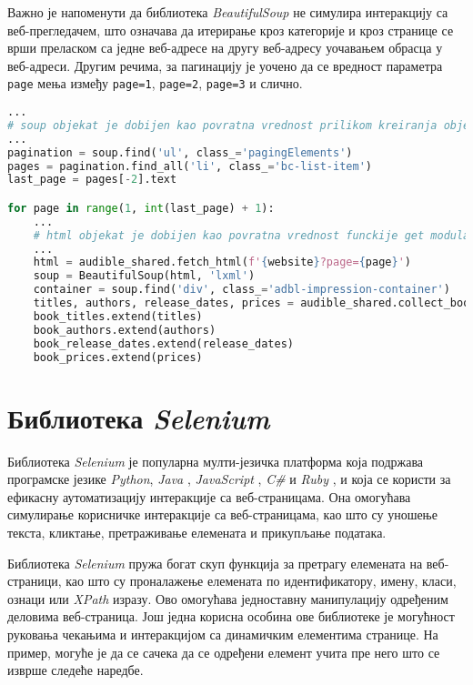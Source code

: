 \documentclass[12pt,oneside]{memoir}
\begin{document}
Важно је напоменути да библиотека \textit{BeautifulSoup} не симулира интеракцију са веб-прегледачем, што означава да итерирање кроз категорије и кроз странице се врши преласком са једне веб-адресе на другу веб-адресу уочавањем обрасца у веб-адреси. Другим речима, за пагинацију је уочено да се вредност параметра \texttt{page} мења између 
\texttt{page=1}, \texttt{page=2}, \texttt{page=3} и слично.
\begin{lstlisting}[language=Python, caption={Прикупљање података са више веб-страница}, label={lst:beautiful-soap-scrape-mutliple}]
...
# soup objekat je dobijen kao povratna vrednost prilikom kreiranja objekta tipa BeautifulSoup
...
pagination = soup.find('ul', class_='pagingElements')
pages = pagination.find_all('li', class_='bc-list-item')
last_page = pages[-2].text

for page in range(1, int(last_page) + 1):
    ...
    # html objekat je dobijen kao povratna vrednost funckije get modula requests 
    ...
    html = audible_shared.fetch_html(f'{website}?page={page}')
    soup = BeautifulSoup(html, 'lxml')
    container = soup.find('div', class_='adbl-impression-container')
    titles, authors, release_dates, prices = audible_shared.collect_books_info(container)
    book_titles.extend(titles)
    book_authors.extend(authors)
    book_release_dates.extend(release_dates)
    book_prices.extend(prices)
\end{lstlisting}

\section{Библиотека \textit{Selenium}}
\label{chp:selenium}
Библиотека \textit{Selenium} је популарна мулти-језичка платформа која подржава програмске језике \textit{Python}, \textit{Java} \cite{javaDocs}, \textit{JavaScript} \cite{javaScriptDocs}, \textit{C\#} \cite{cSharpDocs} и \textit{Ruby} \cite{rubyDocs}, и која се користи за ефикасну аутоматизацију интеракције са веб-страницама. Она омогућава симулирање корисничке интеракције са веб-страницама, као што су уношење текста, кликтање, претраживање елемената и прикупљање података. 

Библиотека \textit{Selenium} пружа богат скуп функција за претрагу елемената на веб-страници, као што су проналажење елемената по идентификатору, имену, класи, ознаци или \textit{XPath} изразу. Ово омогућава једноставну манипулацију одређеним деловима веб-страница. Још једна корисна особина ове библиотеке је могућност руковања чекањима и интеракцијом са динамичким елементима странице. На пример, могуће је да се сачека да се одређени елемент учита пре него што се изврше следеће наредбе.
\end{document}

